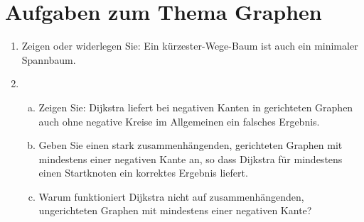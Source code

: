 \documentclass{scrartcl}
\begin{document}
\section*{Aufgaben zum Thema Graphen}
\begin{enumerate}[(1)]

\item Zeigen oder widerlegen Sie: Ein k\"urzester-Wege-Baum ist auch ein minimaler Spannbaum.

\item \begin{enumerate}[(a)]
\item Zeigen Sie: Dijkstra liefert bei negativen Kanten in gerichteten Graphen auch ohne negative Kreise im Allgemeinen ein falsches Ergebnis.
\item Geben Sie einen stark zusammenh\"angenden, gerichteten Graphen mit mindestens einer negativen Kante an, so dass Dijkstra f\"ur mindestens einen Startknoten ein korrektes Ergebnis liefert.
\item Warum funktioniert Dijkstra nicht auf zusammenh\"angenden, ungerichteten Graphen mit mindestens einer negativen Kante?
\end{enumerate}

\end{enumerate}
\end{document}
